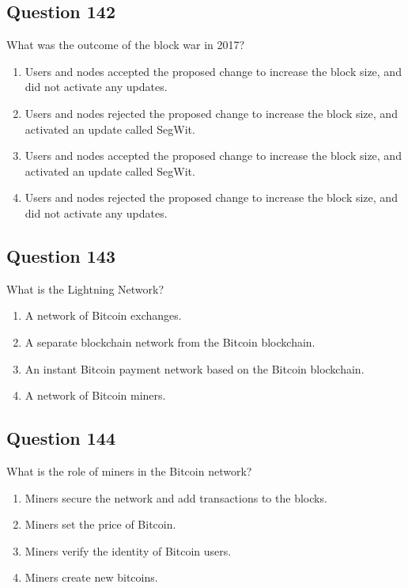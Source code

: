 \documentclass[12pt,a4paper]{article}
\begin{document}
\bigskip


\subsection*{Question 142}
What was the outcome of the block war in 2017?

\begin{enumerate}[label=\Alph*., leftmargin=*]
\item Users and nodes accepted the proposed change to increase the block size, and did not activate any updates.
\item Users and nodes rejected the proposed change to increase the block size, and activated an update called SegWit.
\item Users and nodes accepted the proposed change to increase the block size, and activated an update called SegWit.
\item Users and nodes rejected the proposed change to increase the block size, and did not activate any updates.
\end{enumerate}

\bigskip


\subsection*{Question 143}
What is the Lightning Network?

\begin{enumerate}[label=\Alph*., leftmargin=*]
\item A network of Bitcoin exchanges.
\item A separate blockchain network from the Bitcoin blockchain.
\item An instant Bitcoin payment network based on the Bitcoin blockchain.
\item A network of Bitcoin miners.
\end{enumerate}

\bigskip


\subsection*{Question 144}
What is the role of miners in the Bitcoin network?

\begin{enumerate}[label=\Alph*., leftmargin=*]
\item Miners secure the network and add transactions to the blocks.
\item Miners set the price of Bitcoin.
\item Miners verify the identity of Bitcoin users.
\item Miners create new bitcoins.
\end{enumerate}
\end{document}
